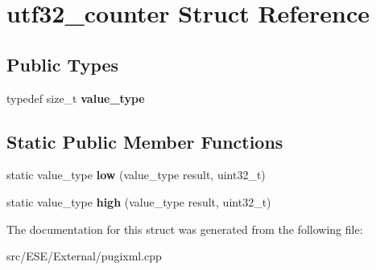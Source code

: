 \hypertarget{structutf32__counter}{\section{utf32\-\_\-counter Struct Reference}
\label{structutf32__counter}
}
\subsection*{Public Types}
\begin{DoxyCompactItemize}
\item 
\hypertarget{structutf32__counter_a6fb6728fe1a009958000f0e934fa6500}{typedef size\-\_\-t {\bfseries value\-\_\-type}}\label{structutf32__counter_a6fb6728fe1a009958000f0e934fa6500}

\end{DoxyCompactItemize}
\subsection*{Static Public Member Functions}
\begin{DoxyCompactItemize}
\item 
\hypertarget{structutf32__counter_a3a75f4840e0391ed972ddba621d49480}{static value\-\_\-type {\bfseries low} (value\-\_\-type result, uint32\-\_\-t)}\label{structutf32__counter_a3a75f4840e0391ed972ddba621d49480}

\item 
\hypertarget{structutf32__counter_aa72f5248b1dc5937330ab049bf449251}{static value\-\_\-type {\bfseries high} (value\-\_\-type result, uint32\-\_\-t)}\label{structutf32__counter_aa72f5248b1dc5937330ab049bf449251}

\end{DoxyCompactItemize}


The documentation for this struct was generated from the following file\-:\begin{DoxyCompactItemize}
\item 
src/\-E\-S\-E/\-External/pugixml.\-cpp\end{DoxyCompactItemize}
